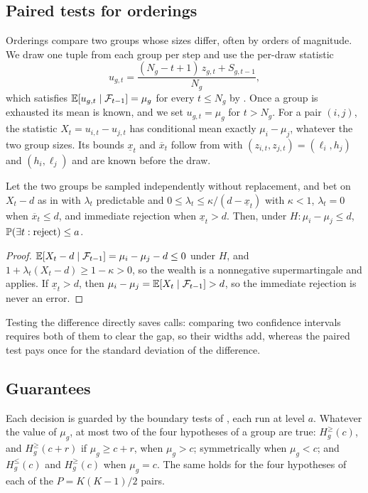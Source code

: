 \subsection{Paired tests for orderings}
\label{sec:pair}

Orderings compare two groups whose sizes differ, often by orders of magnitude.
We draw one tuple from each group per step and use the per-draw statistic
\begin{equation}
u_{g,t}=\frac{(N_g-t+1)\,z_{g,t}+S_{g,t-1}}{N_g},
\label{eq:u}
\end{equation}
which satisfies $\mathbb{E}[u_{g,t}\mid\mathcal{F}_{t-1}]=\mu_g$ for every $t\le N_g$ by .
Once a group is exhausted its mean is known, and we set $u_{g,t}=\mu_g$ for $t>N_g$.
For a pair $(i,j)$, the statistic $X_t=u_{i,t}-u_{j,t}$ has conditional mean exactly $\mu_i-\mu_j$, whatever the two group sizes.
Its bounds $\underline{x}_t$ and $\overline{x}_t$ follow from  with $(z_{i,t},z_{j,t})=(\ell_i,h_j)$ and $(h_i,\ell_j)$ and are known before the draw.

\begin{proposition}
\label{prop:pair}
Let the two groups be sampled independently without replacement, and bet on $X_t-d$ as in  with $\lambda_t$ predictable and $0\le\lambda_t\le\kappa/(d-\underline{x}_t)$ with $\kappa<1$, $\lambda_t=0$ when $\overline{x}_t\le d$, and immediate rejection when $\underline{x}_t>d$.
Then, under $H:\mu_i-\mu_j\le d$, $\mathbb{P}(\exists t:\text{reject})\le a$.
\end{proposition}
\begin{proof}
$\mathbb{E}[X_t-d\mid\mathcal{F}_{t-1}]=\mu_i-\mu_j-d\le0$ under $H$, and $1+\lambda_t(X_t-d)\ge1-\kappa>0$, so the wealth is a nonnegative supermartingale and  applies.
If $\underline{x}_t>d$, then $\mu_i-\mu_j=\mathbb{E}[X_t\mid\mathcal{F}_{t-1}]>d$, so the immediate rejection is never an error.
\end{proof}

Testing the difference directly saves calls: comparing two confidence intervals requires both of them to clear the gap, so their widths add, whereas the paired test pays once for the standard deviation of the difference.

\subsection{Guarantees}
\label{sec:guarantee}

Each decision is guarded by the boundary tests of , each run at level $a$.
Whatever the value of $\mu_g$, at most two of the four hypotheses of a group are true: $H^{\ge}_g(c)$, and $H^{\ge}_g(c+r)$ if $\mu_g\ge c+r$, when $\mu_g>c$; symmetrically when $\mu_g<c$; and $H^{\le}_g(c)$ and $H^{\ge}_g(c)$ when $\mu_g=c$.
The same holds for the four hypotheses of each of the $P=K(K-1)/2$ pairs.


